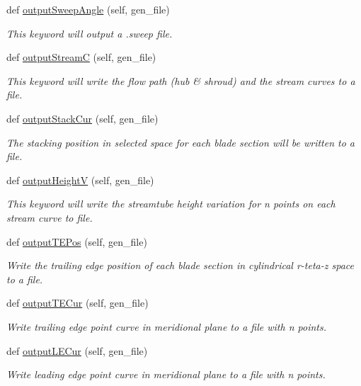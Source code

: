 \begin{DoxyCompactItemize}
def \hyperlink{a00071_a9d8a631853a80acf18ab0d1c05a11dec}{output\+Sweep\+Angle} (self, gen\+\_\+file)
\begin{DoxyCompactList}\small\item\em This keyword will output a .sweep file. \end{DoxyCompactList}\item 
def \hyperlink{a00071_a6dc19a2bae75b4c52b4337a55574363d}{output\+StreamC} (self, gen\+\_\+file)
\begin{DoxyCompactList}\small\item\em This keyword will write the flow path (hub \& shroud) and the stream curves to a file. \end{DoxyCompactList}\item 
def \hyperlink{a00071_a38ac1495c5c1cc730241601a8300d632}{output\+Stack\+Cur} (self, gen\+\_\+file)
\begin{DoxyCompactList}\small\item\em The stacking position in selected space for each blade section will be written to a file. \end{DoxyCompactList}\item 
def \hyperlink{a00071_a15fdf4aaecf99b885796124500f80114}{output\+HeightV} (self, gen\+\_\+file)
\begin{DoxyCompactList}\small\item\em This keyword will write the streamtube height variation for n points on each stream curve to file. \end{DoxyCompactList}\item 
def \hyperlink{a00071_af96b8ec5130403c737d4105e04edea5d}{output\+T\+E\+Pos} (self, gen\+\_\+file)
\begin{DoxyCompactList}\small\item\em Write the trailing edge position of each blade section in cylindrical r-\/teta-\/z space to a file. \end{DoxyCompactList}\item 
def \hyperlink{a00071_a93fdb47e6f9162ce3fe7ef624f7681aa}{output\+T\+E\+Cur} (self, gen\+\_\+file)
\begin{DoxyCompactList}\small\item\em Write trailing edge point curve in meridional plane to a file with n points. \end{DoxyCompactList}\item 
def \hyperlink{a00071_a55ddee4c839782858d6f53a49b9c63ec}{output\+L\+E\+Cur} (self, gen\+\_\+file)
\begin{DoxyCompactList}\small\item\em Write leading edge point curve in meridional plane to a file with n points. \end{DoxyCompactList}\item 

\end{DoxyCompactItemize}
